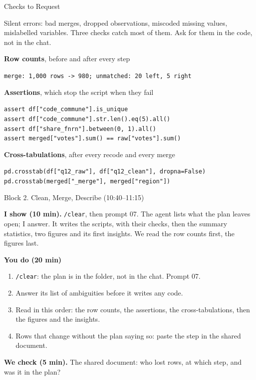 \documentclass[svgnames,x11names,dvipsnames]{beamer}
\begin{document}
\begin{frame}[fragile]{Checks to Request}

\small
Silent errors: bad merges, dropped observations, miscoded missing values, mislabelled variables. Three checks catch most of them. Ask for them in the code, not in the chat.

\vspace{0.3cm}

\textbf{Row counts}, before and after every step

{\footnotesize \verb|merge: 1,000 rows -> 980; unmatched: 20 left, 5 right|}

\vspace{0.25cm}

\textbf{Assertions}, which stop the script when they fail

{\footnotesize
\verb|assert df["code_commune"].is_unique|\\
\verb|assert df["code_commune"].str.len().eq(5).all()|\\
\verb|assert df["share_fnrn"].between(0, 1).all()|\\
\verb|assert merged["votes"].sum() == raw["votes"].sum()|}

\vspace{0.25cm}

\textbf{Cross-tabulations}, after every recode and every merge

{\footnotesize
\verb|pd.crosstab(df["q12_raw"], df["q12_clean"], dropna=False)|\\
\verb|pd.crosstab(merged["_merge"], merged["region"])|}

\end{frame}

\begin{frame}{Block 2. Clean, Merge, Describe (10:40--11:15)}

\small
\textbf{I show (10 min).} \texttt{/clear}, then prompt 07. The agent lists what the plan leaves open; I answer. It writes the scripts, with their checks, then the summary statistics, two figures and its first insights. We read the row counts first, the figures last.

\vspace{0.3cm}

\textbf{You do (20 min)}
\begin{enumerate}
    \setlength{\itemsep}{3pt}
    \item \texttt{/clear}: the plan is in the folder, not in the chat. Prompt 07.
    \item Answer its list of ambiguities before it writes any code.
    \item Read in this order: the row counts, the assertions, the cross-tabulations, then the figures and the insights.
    \item Rows that change without the plan saying so: paste the step in the shared document.
\end{enumerate}

\vspace{0.3cm}

\textbf{We check (5 min).} The shared document: who lost rows, at which step, and was it in the plan?

\end{frame}
\end{document}
